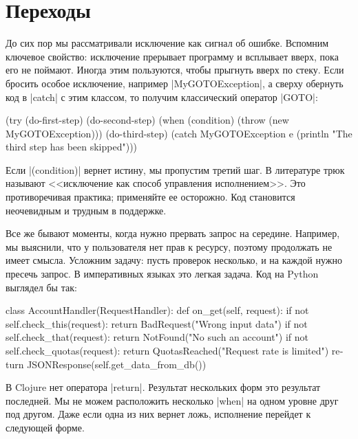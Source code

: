 \section{Переходы}

До сих пор мы рассматривали исключение как сигнал об ошибке. Вспомним ключевое
свойство: исключение прерывает программу и всплывает вверх, пока его не
поймают. Иногда этим пользуются, чтобы прыгнуть вверх по стеку. Если бросить
особое исключение, например \spverb|MyGOTOException|, а сверху обернуть код в
\spverb|catch| с этим классом, то получим классический оператор \spverb|GOTO|:

\begin{english}
  \begin{clojure}
(try
  (do-first-step)
  (do-second-step)
  (when (condition)
    (throw (new MyGOTOException)))
  (do-third-step)
  (catch MyGOTOException e
    (println "The third step has been skipped")))
  \end{clojure}
\end{english}

Если \spverb|(condition)| вернет истину, мы пропустим третий шаг. В литературе
трюк называют <<исключение как способ управления исполнением>>. Это
противоречивая практика; применяйте ее осторожно. Код становится неочевидным и
трудным в поддержке.

Все же бывают моменты, когда нужно прервать запрос на середине. Например, мы
выяснили, что у пользователя нет прав к ресурсу, поэтому продолжать не имеет
смысла. Усложним задачу: пусть проверок несколько, и на каждой нужно пресечь
запрос. В императивных языках это легкая задача. Код на Python выглядел бы так:

\begin{english}
  \begin{python}
class AccountHandler(RequestHandler):
  def on_get(self, request):
    if not self.check_this(request):
      return BadRequest("Wrong input data")
    if not self.check_that(request):
      return NotFound("No such an account")
    if not self.check_quotas(request):
      return QuotasReached("Request rate is limited")
    return JSONResponse(self.get_data_from_db())
  \end{python}
\end{english}

В Clojure нет оператора \spverb|return|. Результат нескольких форм это результат
последней. Мы не можем расположить несколько \spverb|when| на одном уровне друг
под другом. Даже если одна из них вернет ложь, исполнение перейдет к следующей
форме.

